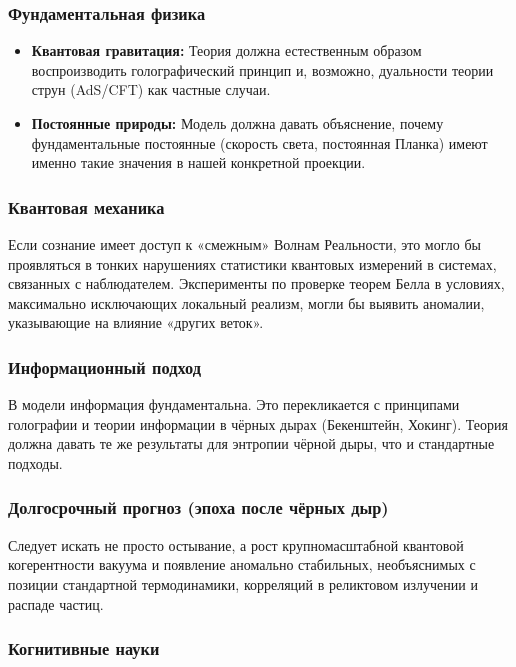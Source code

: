\documentclass[a4paper,12pt]{article}
\begin{document}
\subsubsection{Фундаментальная физика}

\begin{itemize}
	\item \textbf{Квантовая гравитация:} Теория должна естественным образом воспроизводить голографический принцип и, возможно, дуальности теории струн (AdS/CFT) как частные случаи.
	\item \textbf{Постоянные природы:} Модель должна давать объяснение, почему фундаментальные постоянные (скорость света, постоянная Планка) имеют именно такие значения в нашей конкретной проекции.
\end{itemize}

\subsubsection{Квантовая механика}

Если сознание имеет доступ к «смежным» Волнам Реальности, это могло бы проявляться в тонких нарушениях статистики квантовых измерений в системах, связанных с наблюдателем. Эксперименты по проверке теорем Белла в условиях, максимально исключающих локальный реализм, могли бы выявить аномалии, указывающие на влияние «других веток».

\subsubsection{Информационный подход}

В модели информация фундаментальна. Это перекликается с принципами голографии и теории информации в чёрных дырах (Бекенштейн, Хокинг). Теория должна давать те же результаты для энтропии чёрной дыры, что и стандартные подходы.

\subsubsection{Долгосрочный прогноз (эпоха после чёрных дыр)}

Следует искать не просто остывание, а рост крупномасштабной квантовой когерентности вакуума и появление аномально стабильных, необъяснимых с позиции стандартной термодинамики, корреляций в реликтовом излучении и распаде частиц.

\subsubsection{Когнитивные науки}
\end{document}
